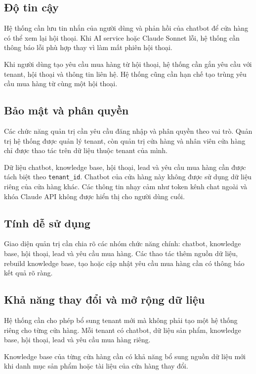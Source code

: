 \documentclass[../DoAn.tex]{subfiles}
\begin{document}
\subsection{Độ tin cậy}

Hệ thống cần lưu tin nhắn của người dùng và phản hồi của chatbot để cửa hàng có thể xem lại hội thoại. Khi AI service hoặc Claude Sonnet lỗi, hệ thống cần thông báo lỗi phù hợp thay vì làm mất phiên hội thoại.

Khi người dùng tạo yêu cầu mua hàng từ hội thoại, hệ thống cần gắn yêu cầu với tenant, hội thoại và thông tin liên hệ. Hệ thống cũng cần hạn chế tạo trùng yêu cầu mua hàng từ cùng một hội thoại.

\subsection{Bảo mật và phân quyền}

Các chức năng quản trị cần yêu cầu đăng nhập và phân quyền theo vai trò. Quản trị hệ thống được quản lý tenant, còn quản trị cửa hàng và nhân viên cửa hàng chỉ được thao tác trên dữ liệu thuộc tenant của mình.

Dữ liệu chatbot, knowledge base, hội thoại, lead và yêu cầu mua hàng cần được tách biệt theo \texttt{tenant\_id}. Chatbot của cửa hàng này không được sử dụng dữ liệu riêng của cửa hàng khác. Các thông tin nhạy cảm như token kênh chat ngoài và khóa Claude API không được hiển thị cho người dùng cuối.

\subsection{Tính dễ sử dụng}

Giao diện quản trị cần chia rõ các nhóm chức năng chính: chatbot, knowledge base, hội thoại, lead và yêu cầu mua hàng. Các thao tác thêm nguồn dữ liệu, rebuild knowledge base, tạo hoặc cập nhật yêu cầu mua hàng cần có thông báo kết quả rõ ràng.

\subsection{Khả năng thay đổi và mở rộng dữ liệu}

Hệ thống cần cho phép bổ sung tenant mới mà không phải tạo một hệ thống riêng cho từng cửa hàng. Mỗi tenant có chatbot, dữ liệu sản phẩm, knowledge base, hội thoại, lead và yêu cầu mua hàng riêng.

Knowledge base của từng cửa hàng cần có khả năng bổ sung nguồn dữ liệu mới khi danh mục sản phẩm hoặc tài liệu của cửa hàng thay đổi.
\end{document}
